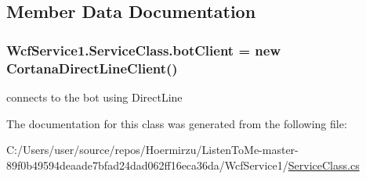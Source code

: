 \subsection{Member Data Documentation}
\subsubsection[{\texorpdfstring{bot\+Client}{botClient}}]{ Wcf\+Service1.\+Service\+Class.\+bot\+Client = new {\bf Cortana\+Direct\+Line\+Client}()\hspace{0.3cm}{\ttfamily [private]}}\hypertarget{class_wcf_service1_1_1_service_class_a9bd8bdea6c82d92334badcb56a75d0a8}{}\label{class_wcf_service1_1_1_service_class_a9bd8bdea6c82d92334badcb56a75d0a8}


connects to the bot using Direct\+Line 



The documentation for this class was generated from the following file\+:\begin{DoxyCompactItemize}
\item 
C\+:/\+Users/user/source/repos/\+Hoermirzu/\+Listen\+To\+Me-\/master-\/89f0b49594deaade7bfad24dad062ff16eca36da/\+Wcf\+Service1/\hyperlink{_service_class_8cs}{Service\+Class.\+cs}\end{DoxyCompactItemize}
